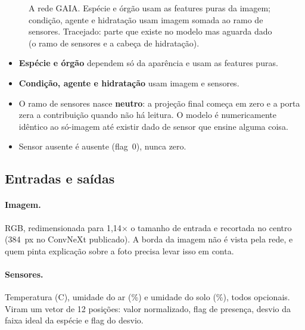\documentclass[11pt,a4paper]{article}
\begin{document}
\begin{figure}[h]
{}
\caption{A rede GAIA. Espécie e órgão usam as features puras da imagem; condição,
agente e hidratação usam imagem somada ao ramo de sensores. Tracejado: parte que
existe no modelo mas aguarda dado (o ramo de sensores e a cabeça de hidratação).}
\label{fig:rede}
\end{figure}

\begin{itemize}
  \item \textbf{Espécie e órgão} dependem só da aparência e usam as features puras.
  \item \textbf{Condição, agente e hidratação} usam imagem e sensores.
  \item O ramo de sensores nasce \textbf{neutro}: a projeção final começa em zero e a
  porta zera a contribuição quando não há leitura. O modelo é numericamente idêntico
  ao só-imagem até existir dado de sensor que ensine alguma coisa.
  \item Sensor ausente é ausente (flag~0), nunca zero.
\end{itemize}

\subsection{Entradas e saídas}
\paragraph{Imagem.} RGB, redimensionada para 1,14$\times$ o tamanho de entrada e
recortada no centro (384~px no ConvNeXt publicado). A borda da imagem não é vista
pela rede, e quem pinta explicação sobre a foto precisa levar isso em conta.

\paragraph{Sensores.} Temperatura (\textdegree C), umidade do ar (\%) e umidade do
solo (\%), todos opcionais. Viram um vetor de 12 posições: valor normalizado, flag de
presença, desvio da faixa ideal da espécie e flag do desvio.
\end{document}
